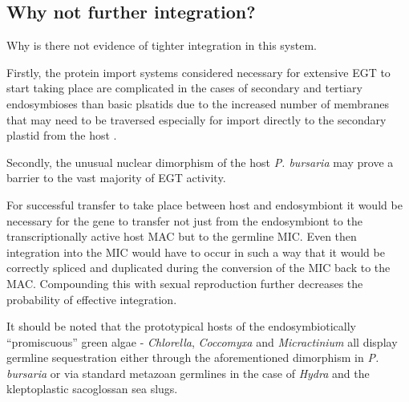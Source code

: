 \subsection{Why not further integration?}

Why is there not evidence of tighter integration in this system.

Firstly, the protein import systems considered necessary for extensive
EGT to start taking place are complicated
in the cases of secondary and tertiary endosymbioses
than basic plsatids due to the increased number
of membranes that may need to be traversed especially
for import directly to the secondary plastid from the
host \citep{Hirakawa2012}.


Secondly, the unusual nuclear dimorphism of the host \textit{P. bursaria}
may prove a barrier to the vast majority of EGT activity. 

For successful transfer to take place between host and endosymbiont it
would be necessary for the gene to transfer not just from the 
endosymbiont to the transcriptionally active host MAC but to the germline
MIC.  Even then integration into the MIC would have to occur in such a way
that it would be correctly spliced and duplicated during the conversion of the MIC
back to the MAC.
Compounding this with sexual reproduction further decreases the probability of
effective integration.

It should be noted that the prototypical hosts of the endosymbiotically ``promiscuous''
green algae - \textit{Chlorella}, \textit{Coccomyxa} and \textit{Micractinium} 
all display germline sequestration either through the aforementioned dimorphism
in \textit{P. bursaria} or via standard metazoan germlines in the case of
\textit{Hydra} and the kleptoplastic sacoglossan sea slugs. 

